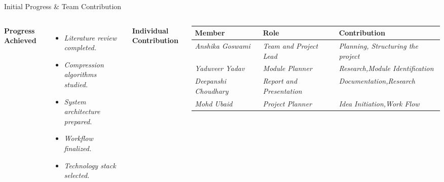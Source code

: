 \documentclass[aspectratio=169,11pt]{beamer}
\newcommand{\placeholder}[1]{\textit{\color{GEUGrey}#1}}
\begin{document}
\begin{frame}{Initial Progress \& Team Contribution}

\begin{columns}[T,totalwidth=\textwidth]


{\small
\textbf{\color{GEUBlue}Progress Achieved}
}

\begin{itemize}

\setlength{\itemsep}{2pt}

\small

\item
\placeholder{Literature review completed.}

\item
\placeholder{Compression algorithms studied.}

\item
\placeholder{System architecture prepared.}

\item
\placeholder{Workflow finalized.}

\item
\placeholder{Technology stack selected.}

\end{itemize}



{\small
\textbf{\color{GEUBlue}Individual Contribution}
}

\vspace{1mm}

\scriptsize

\renewcommand{\arraystretch}{1.10}

\begin{tabularx}{\textwidth}
{
@{}
p{1.55cm}
p{1.55cm}
X
@{}
}

\toprule

Member
&
Role
&
Contribution
\\

\midrule

\placeholder{Anshika Goswami}
&
\placeholder{Team and Project Lead}
&
\placeholder{
Planning, Structuring the project
}
\\

\placeholder{Yaduveer Yadav}
&
\placeholder{Module Planner}
&
\placeholder{
Research,Module Identification
}
\\

\placeholder{Deepanshi Choudhary}
&
\placeholder{Report and Presentation}
&
\placeholder{
Documentation,Research
}
\\

\placeholder{Mohd Ubaid}
&
\placeholder{Project Planner}
&
\placeholder{
Idea Initiation,Work Flow 
}
\\

\bottomrule

\end{tabularx}

\end{columns}

\end{frame}
\end{document}
